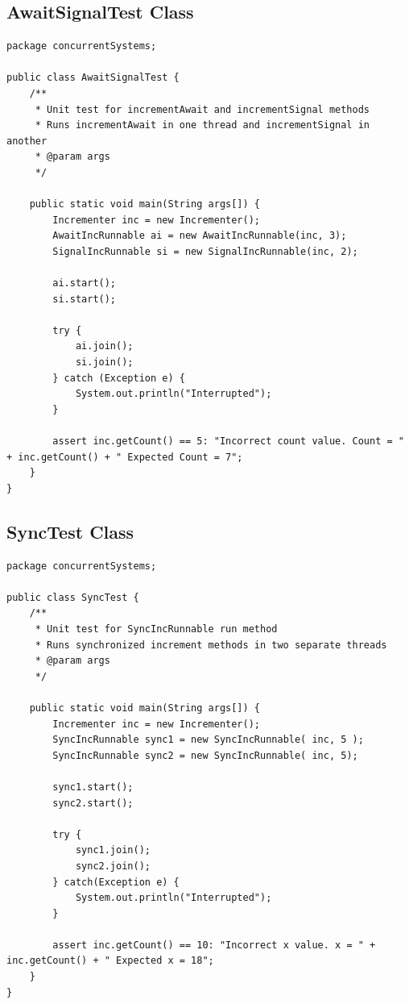 \documentclass[a4paper,12pt]{article}
\begin{document}
\subsection{AwaitSignalTest Class} \label{appendix:AwaitSignalTest}

\begin{lstlisting}
package concurrentSystems;

public class AwaitSignalTest {
    /**
     * Unit test for incrementAwait and incrementSignal methods
     * Runs incrementAwait in one thread and incrementSignal in another
     * @param args
     */

    public static void main(String args[]) {
        Incrementer inc = new Incrementer();
        AwaitIncRunnable ai = new AwaitIncRunnable(inc, 3);
        SignalIncRunnable si = new SignalIncRunnable(inc, 2);

        ai.start();
        si.start();

        try {
            ai.join();
            si.join();
        } catch (Exception e) {
            System.out.println("Interrupted");
        }

        assert inc.getCount() == 5: "Incorrect count value. Count = " + inc.getCount() + " Expected Count = 7";
    }
}
\end{lstlisting}

\subsection{SyncTest Class} \label{appendix:SyncTest}

\begin{lstlisting}
package concurrentSystems;

public class SyncTest {
    /**
     * Unit test for SyncIncRunnable run method
     * Runs synchronized increment methods in two separate threads
     * @param args
     */

    public static void main(String args[]) {
        Incrementer inc = new Incrementer();
        SyncIncRunnable sync1 = new SyncIncRunnable( inc, 5 );
        SyncIncRunnable sync2 = new SyncIncRunnable( inc, 5);

        sync1.start();
        sync2.start();

        try {
            sync1.join();
            sync2.join();
        } catch(Exception e) {
            System.out.println("Interrupted");
        }

        assert inc.getCount() == 10: "Incorrect x value. x = " + inc.getCount() + " Expected x = 18";
    }
}
\end{lstlisting}
\end{document}
